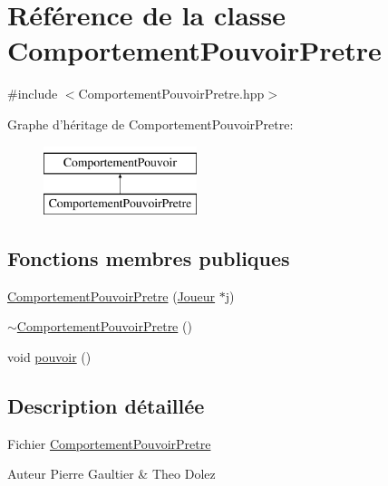 \hypertarget{class_comportement_pouvoir_pretre}{\section{Référence de la classe Comportement\-Pouvoir\-Pretre}
\label{class_comportement_pouvoir_pretre}
}


{\ttfamily \#include $<$Comportement\-Pouvoir\-Pretre.\-hpp$>$}

Graphe d'héritage de Comportement\-Pouvoir\-Pretre\-:\begin{figure}[H]
\begin{center}
\leavevmode
\includegraphics[height=2.000000cm]{class_comportement_pouvoir_pretre}
\end{center}
\end{figure}
\subsection*{Fonctions membres publiques}
\begin{DoxyCompactItemize}
\item 
\hyperlink{class_comportement_pouvoir_pretre_a997a0441eabec5c50a1cfa29d9aabdaa}{Comportement\-Pouvoir\-Pretre} (\hyperlink{class_joueur}{Joueur} $\ast$j)
\item 
\hyperlink{class_comportement_pouvoir_pretre_a5232928218a13a88d8f1d4aecf440147}{$\sim$\-Comportement\-Pouvoir\-Pretre} ()
\item 
void \hyperlink{class_comportement_pouvoir_pretre_a24e87d9b2cb5ab4116d67ace5d3c9687}{pouvoir} ()
\end{DoxyCompactItemize}


\subsection{Description détaillée}
Fichier \hyperlink{class_comportement_pouvoir_pretre}{Comportement\-Pouvoir\-Pretre} \begin{DoxyAuthor}{Auteur}
Pierre Gaultier \& Theo Dolez 
\end{DoxyAuthor}


